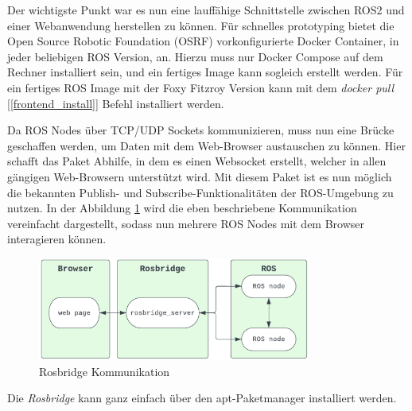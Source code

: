 \begin{flushleft}

Der wichtigste Punkt war es nun eine lauffähige Schnittstelle zwischen ROS2 und einer Webanwendung herstellen zu können.
Für schnelles prototyping bietet die Open Source Robotic Foundation (OSRF) vorkonfigurierte Docker Container, in jeder beliebigen ROS Version, an.
Hierzu muss nur Docker Compose auf dem Rechner installiert sein, und ein fertiges Image kann sogleich erstellt werden.
Für ein fertiges ROS Image mit der Foxy Fitzroy Version kann mit dem \textit{docker pull} [\ref{frontend_install}] Befehl installiert werden. 


Da ROS Nodes über TCP/UDP Sockets kommunizieren, muss nun eine Brücke geschaffen werden, um Daten mit dem Web-Browser austauschen zu können.
Hier schafft das \cite[Rosbridge]{rosbridgepackage} Paket Abhilfe, in dem es einen Websocket erstellt, welcher in allen gängigen Web-Browsern unterstützt wird. Mit diesem Paket ist es nun möglich die bekannten Publish- und Subscribe-Funktionalitäten der ROS-Umgebung zu nutzen.
In der Abbildung \ref{fig:rosbridge_chain} wird die eben beschriebene Kommunikation vereinfacht dargestellt, sodass nun mehrere ROS Nodes mit dem Browser interagieren können.
\begin{figure}[h!]
    \centering
    \includegraphics[width=0.8\textwidth]{imgs/web/rosbridge_chain.png}
    \caption{Rosbridge Kommunikation \cite{foxyglove_rosbridge_tut}}
    \label{fig:rosbridge_chain}%
\end{figure}
Die \textit{Rosbridge} kann ganz einfach über den apt-Paketmanager installiert werden.




\end{flushleft}
